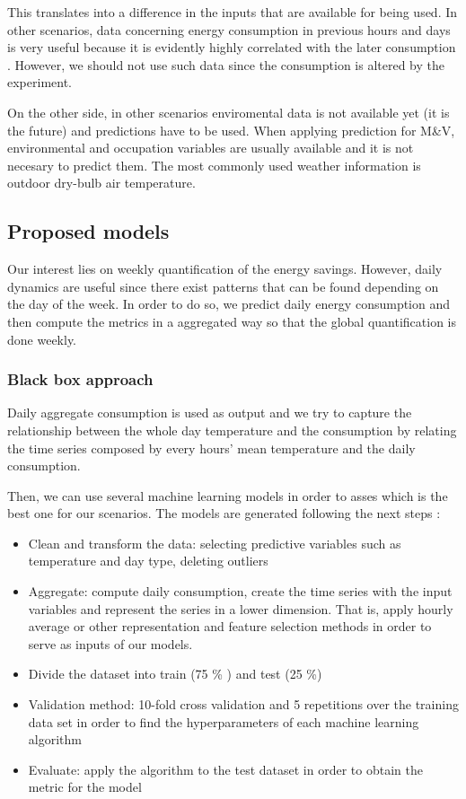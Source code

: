 \documentclass[10pt, conference, compsocconf]{IEEEtran}
\begin{document}
This translates into a difference in the inputs that are available for being used. In other scenarios, data concerning energy consumption in previous hours and days is very useful because it is evidently highly correlated with the later consumption \cite{aman2014empirical}. However, we should not use such data since the consumption is altered by the experiment.

On the other side, in other scenarios enviromental data is not available yet (it is the future) and predictions have to be used. When applying prediction for M\&V, environmental and occupation variables are usually available and it is not necesary to predict them. The most commonly used weather information is outdoor dry-bulb air temperature.



\subsection{Proposed models}

Our interest lies on weekly quantification of the energy savings. However, daily dynamics are useful since there exist patterns that can be found depending on the day of the week. In order to do so, we  predict daily energy consumption and then compute the metrics in a aggregated way so that the global quantification is done weekly.

\subsubsection{Black box approach}

Daily aggregate consumption is used as output and we try to capture the relationship between the whole day temperature and the consumption by relating the time series composed by every hours' mean temperature and the daily consumption.

Then, we can use several machine learning models in order to asses which is the best one for our scenarios. The models are generated  following the next steps \cite{gonzalez2016towards}:

\begin{itemize}
\item Clean and transform the data: selecting predictive variables such as temperature and day type, deleting outliers 
\item Aggregate: compute daily consumption, create the time series with the input variables and represent the series in a lower dimension. That is, apply hourly average or other representation and feature selection methods in order to serve as inputs of our models.
\item Divide the dataset into train (75 \% ) and test (25 \%)
\item Validation method: 10-fold cross validation and 5 repetitions over the training data set in order to find the hyperparameters of each machine learning algorithm
\item Evaluate: apply the algorithm to the test dataset in order to obtain the metric for the model
\end{itemize}
\end{document}
